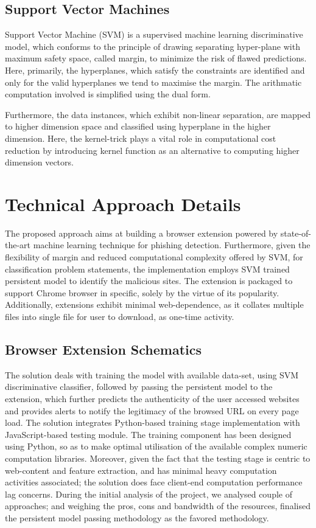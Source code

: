 \documentclass[conference]{IEEEtran}
\begin{document}
\subsection{Support Vector Machines}
\par Support Vector Machine (SVM) is a supervised machine
learning discriminative model, which conforms to the principle
of drawing separating hyper-plane with maximum safety space,
called margin, to minimize the risk of flawed predictions.
Here, primarily, the hyperplanes, which satisfy the constraints
are identified and only for the valid hyperplanes we tend to
maximise the margin. The arithmatic computation involved is
simplified using the dual form.
\par Furthermore, the data instances, which exhibit non-linear
separation, are mapped to higher dimension space and classified
using hyperplane in the higher dimension. Here, the
kernel-trick plays a vital role in computational cost reduction
by introducing kernel function as an alternative to computing
higher dimension vectors.
\section{Technical Approach Details}
\par The proposed approach aims at building a browser extension
powered by state-of-the-art machine learning technique
for phishing detection. Furthermore, given the flexibility of
margin and reduced computational complexity offered by
SVM, for classification problem statements, the implementation
employs SVM trained persistent model to identify the
malicious sites. The extension is packaged to support Chrome
browser in specific, solely by the virtue of its popularity.
Additionally, extensions exhibit minimal web-dependence, as
it collates multiple files into single file for user to download,
as one-time activity.
\subsection{Browser Extension Schematics}
The solution deals with training the model with available
data-set, using SVM discriminative classifier, followed by
passing the persistent model to the extension, which further
predicts the authenticity of the user accessed websites and
provides alerts to notify the legitimacy of the browsed URL on
every page load. The solution integrates Python-based training
stage implementation with JavaScript-based testing module.
The training component has been designed using Python, so as
to make optimal utilisation of the available complex numeric
computation libraries. Moreover, given the fact that the testing
stage is centric to web-content and feature extraction, and has
minimal heavy computation activities associated; the solution
does face client-end computation performance lag concerns.
During the initial analysis of the project, we analysed
couple of approaches; and weighing the pros, cons and
bandwidth of the resources, finalised the persistent model
passing methodology as the favored methodology.
\end{document}
